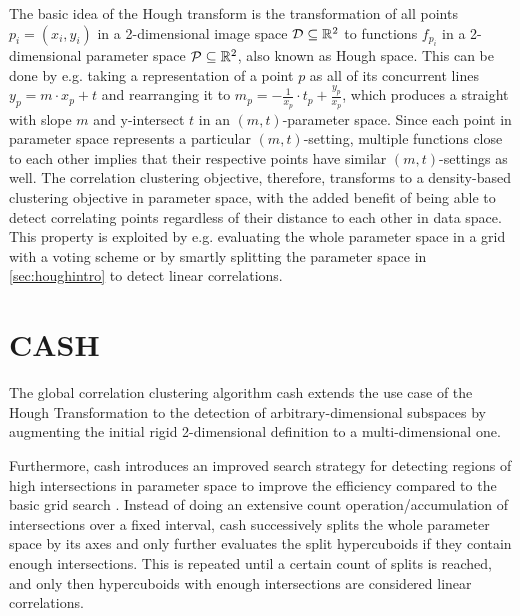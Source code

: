 The basic idea of the Hough transform is the transformation of all points $p_i = (x_i,y_i)$ in a 2-dimensional image space $\mathcal{D} \subseteq \mathbb{R}^2$ to functions $f_{p_i}$ in a 2-dimensional parameter space $\mathcal{P} \subseteq \mathbb{R}^2$, also known as Hough space\cite{illingworth1988survey}. This can be done by e.g. taking a representation of a point $p$ as all of its concurrent lines $y_p = m \cdot x_p + t$ and rearranging it to $m_{p} = - \frac{1}{x_p} \cdot t_{p} + \frac{y_p}{x_p}$, which produces a straight with slope $m$ and y-intersect $t$ in an $(m,t)$-parameter space. Since each point in parameter space represents a particular $(m,t)$-setting, multiple functions close to each other implies that their respective points have similar $(m,t)$-settings as well. The correlation clustering objective, therefore, transforms to a density-based clustering objective in parameter space, with the added benefit of being able to detect correlating points regardless of their distance to each other in data space. This property is exploited by e.g. evaluating the whole parameter space in a grid with a voting scheme or by smartly splitting the parameter space in \autoref{sec:houghintro} to detect linear correlations. 

\section{CASH}\label{sec:cashintro}
The global correlation clustering algorithm \gls{cash} extends the use case of the Hough Transformation to the detection of arbitrary-dimensional subspaces by augmenting the initial rigid 2-dimensional definition to a multi-dimensional one. 

Furthermore, \gls{cash} introduces an improved search strategy for detecting regions of high intersections in parameter space to improve the efficiency compared to the basic grid search \cite{CASHachtert2008global}. Instead of doing an extensive count operation/accumulation of intersections over a fixed interval, \gls{cash} successively splits the whole parameter space by its axes and only further evaluates the split hypercuboids if they contain enough intersections. This is repeated until a certain count of splits is reached, and only then hypercuboids with enough intersections are considered linear correlations. 


